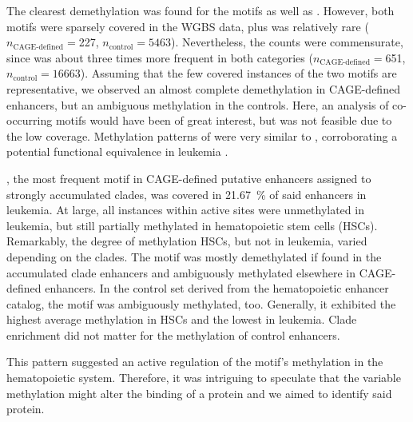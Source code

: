 The clearest demethylation was found for the motifs \motifetsone as well as \motifxc {} . However, both motifs were sparsely covered in the WGBS data, plus \motifxc was relatively rare ($n_{\text{CAGE-defined}}=$\num{227}, $n_{\text{control}}= 5463$). Nevertheless, the counts were commensurate, since \motifetsone was about three times more frequent in both categories ($n_{\text{CAGE-defined}}=$\num{651}, $n_{\text{control}}= 16663$). Assuming that the few covered instances of the two motifs are representative, we observed an almost complete demethylation in CAGE-defined enhancers, but an ambiguous methylation in the controls. Here, an analysis of co-occurring motifs would have been of great interest, but was not feasible due to the low coverage. Methylation patterns of \motifetsone were very similar to \motifpuone, corroborating a potential functional equivalence in leukemia \dns. 

\motifmlltwo, the most frequent motif in CAGE-defined putative enhancers assigned to strongly accumulated clades, was covered in \SI{21.67}{\percent} of said enhancers in leukemia. At large, all instances within active sites were unmethylated in \mllafnine leukemia, but still partially methylated in hematopoietic stem cells (HSCs). Remarkably, the degree of methylation HSCs, but not in leukemia, varied depending on the clades. The motif was mostly demethylated if found in the accumulated clade enhancers and ambiguously methylated elsewhere in CAGE-defined enhancers. In the control set derived from the hematopoietic enhancer catalog, the motif was ambiguously methylated, too. Generally, it exhibited the highest average methylation in HSCs and the lowest in \dnmtchip leukemia. Clade enrichment did not matter for the methylation of control enhancers.

This pattern suggested an active regulation of the motif's methylation in the hematopoietic system. Therefore, it was intriguing to speculate that the variable methylation might alter the binding of a protein and we aimed to identify said protein. 